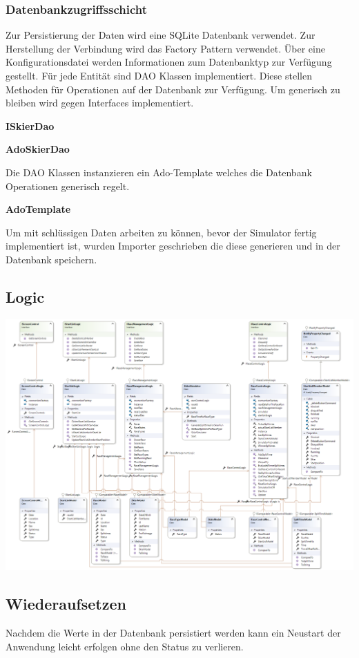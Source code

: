 \documentclass[a4paper, 12pt]{article}
\begin{document}
	\subsubsection{Datenbankzugriffsschicht}
	Zur Persistierung der Daten wird eine SQLite Datenbank verwendet. Zur Herstellung der Verbindung wird das Factory Pattern verwendet. Über eine Konfigurationsdatei werden Informationen zum Datenbanktyp zur Verfügung gestellt. Für jede Entität sind DAO Klassen implementiert. Diese stellen Methoden für Operationen auf der Datenbank zur Verfügung. Um generisch zu bleiben wird gegen Interfaces implementiert.
	\newline
	 
	\textbf{ISkierDao}
	
	\textbf{AdoSkierDao}
	
	
	Die DAO Klassen instanzieren ein Ado-Template welches die Datenbank Operationen generisch regelt.
	
	\textbf{AdoTemplate}
	
	
	Um mit schlüssigen Daten arbeiten zu können, bevor der Simulator fertig implementiert ist, wurden Importer geschrieben die diese generieren und in der Datenbank speichern.
	
	\subsection{Logic}
	\includegraphics[width=.9\textwidth]{img/Logic.png}\\
	
	\subsection{Wiederaufsetzen}
	Nachdem die Werte in der Datenbank persistiert werden kann ein Neustart der Anwendung leicht erfolgen ohne den Status zu verlieren.
	
\end{document}
